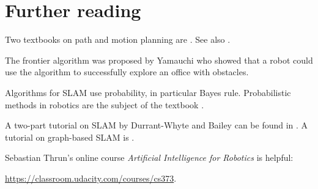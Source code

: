\section{Further reading}

Two textbooks on path and motion planning are \cite{latombe,lavalle}. See also \cite[Chapter 6]{siegwart}.

The frontier algorithm was proposed by Yamauchi \cite{yamauchi} who showed that a robot could use the algorithm to successfully explore an office with obstacles.

Algorithms for SLAM use probability, in particular Bayes rule. Probabilistic methods in robotics are the subject of the textbook \cite{thrun}.

A two-part tutorial on SLAM by Durrant-Whyte and Bailey can be found in \cite{slam-tutorial1,slam-tutorial2}. A tutorial on graph-based SLAM is \cite{slam-graph}.

Sebastian Thrun's online course \emph{Artificial Intelligence for Robotics} is helpful:\par\url{https://classroom.udacity.com/courses/cs373}.




